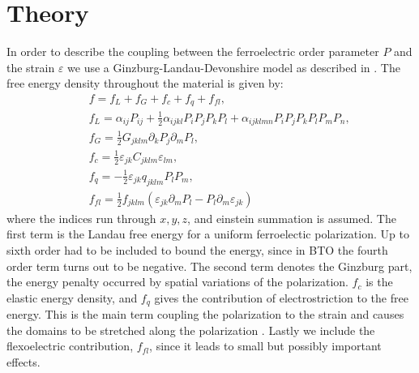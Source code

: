 {\section{Theory}
In order to describe the coupling between the ferroelectric order parameter $P$ and the strain $\varepsilon$ we use a Ginzburg-Landau-Devonshire model as described in \cite{Marton2010}. The free energy density throughout the material is given by:
\begin{eqnarray}\label{eq:BTO_energy}
&&f = f_{L}+f_{G}+f_{c}+f_{q}+f_{fl},\\
&&f_{L} = \alpha_{ij}P_{ij} + \frac{1}{2}\alpha_{ijkl}P_{i}P_{j}P_{k}P_{l} + \alpha_{ijklmn} P_i P_j P_k P_l P_m P_n,\\
&&f_{G} = \frac{1}{2}G_{jklm}\partial_k P_j\partial_m P_l,\\
&&f_{c} = \frac{1}{2}\varepsilon_{jk}C_{jklm}\varepsilon_{lm},\\
&&f_{q}=-\frac{1}{2}\varepsilon_{jk}q_{jklm}P_{l}P_{m},\label{eq:qpp}\\
&&f_{fl}=\frac{1}{2}f_{jklm}(\varepsilon_{jk}\partial_mP_l-P_l\partial_m\varepsilon_{jk})
\end{eqnarray}
where the indices run through ${x,y,z}$, and einstein summation is assumed. The first term is the Landau free energy for a uniform ferroelectic polarization. Up to sixth order had to be included to bound the energy, since in BTO the fourth order term turns out to be negative. The second term denotes the Ginzburg part, the energy penalty occurred by spatial variations of the polarization. $f_c$ is the elastic energy density, and $f_q$ gives the contribution of electrostriction to the free energy. This is the main term coupling the polarization to the strain and causes the domains to be stretched along the polarization . Lastly we include the flexoelectric contribution, $f_{fl}$, since it leads to small but possibly important effects.

}
